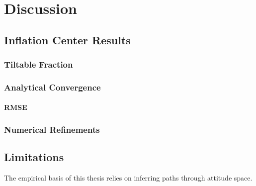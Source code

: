 \chapter{Discussion}\label{cha:discussion}

\section{Inflation Center Results}

\subsection{Tiltable Fraction}\label{sec:tiltable-fraction}

\subsection{Analytical Convergence}\label{sec:convergence}

\subsubsection{\acs{RMSE}}\label{sec:rmse}

\subsection{Numerical Refinements}

\section{Limitations}

The empirical basis of this thesis relies on inferring paths through attitude space.

